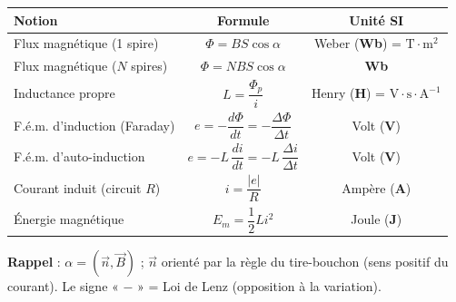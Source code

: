 \documentclass[11pt]{article}
\begin{document}
\begin{aretenir}
\begin{center}
\begin{tabular}{|l|c|c|}\hline
\textbf{Notion} & \textbf{Formule} & \textbf{Unité SI} \\ \hline
Flux magnétique (1 spire) & $\Phi = B S \cos\alpha$ & Weber (\textbf{Wb}) = $\mathrm{T}\cdot\mathrm{m}^2$ \\
Flux magnétique ($N$ spires) & $\Phi = N B S \cos\alpha$ & \textbf{Wb} \\
Inductance propre & $L = \dfrac{\Phi_p}{i}$ & Henry (\textbf{H}) = $\mathrm{V}\cdot\mathrm{s}\cdot\mathrm{A}^{-1}$ \\
F.é.m. d'induction (Faraday) & $e = -\dfrac{d\Phi}{dt} = -\dfrac{\Delta\Phi}{\Delta t}$ & Volt (\textbf{V}) \\
F.é.m. d'auto-induction & $e = -L\,\dfrac{di}{dt} = -L\,\dfrac{\Delta i}{\Delta t}$ & Volt (\textbf{V}) \\
Courant induit (circuit $R$) & $i = \dfrac{|e|}{R}$ & Ampère (\textbf{A}) \\
Énergie magnétique & $E_m = \dfrac{1}{2} L i^2$ & Joule (\textbf{J}) \\ \hline
\end{tabular}
\end{center}
\textbf{Rappel} : $\alpha = (\vec{n}, \vec{B})$ ; $\vec{n}$ orienté par la règle du tire-bouchon (sens positif du courant). Le signe « $-$ » = Loi de Lenz (opposition à la variation).
\end{aretenir}
\end{document}
